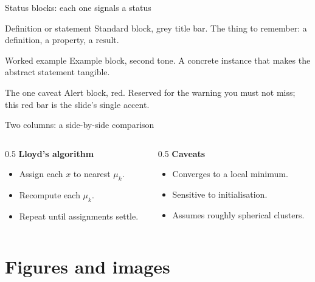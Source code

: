 \documentclass[aspectratio=169]{beamer}
\begin{document}
\begin{frame}{Status blocks: each one signals a status}
  \begin{block}{Definition or statement}
    Standard block, grey title bar. The thing to remember: a definition,
    a property, a result.
  \end{block}
  \begin{exampleblock}{Worked example}
    Example block, second tone. A concrete instance that makes the abstract
    statement tangible.
  \end{exampleblock}
  \begin{alertblock}{The one caveat}
    Alert block, red. Reserved for the warning you must not miss; this red bar
    is the slide's single accent.
  \end{alertblock}
\end{frame}

\begin{frame}{Two columns: a side-by-side comparison}
  \begin{columns}[T,onlytextwidth]
    \begin{column}{0.5\textwidth}
      \textbf{Lloyd's algorithm}
      \begin{itemize}
        \item Assign each $x$ to nearest $\mu_k$.
        \item Recompute each $\mu_k$.
        \item Repeat until assignments settle.
      \end{itemize}
    \end{column}
    \begin{column}{0.5\textwidth}
      \textbf{Caveats}
      \begin{itemize}
        \item Converges to a \textcolor{DHBWred}{local} minimum.
        \item Sensitive to initialisation.
        \item Assumes roughly spherical clusters.
      \end{itemize}
    \end{column}
  \end{columns}
\end{frame}

\section{Figures and images}
\end{document}
